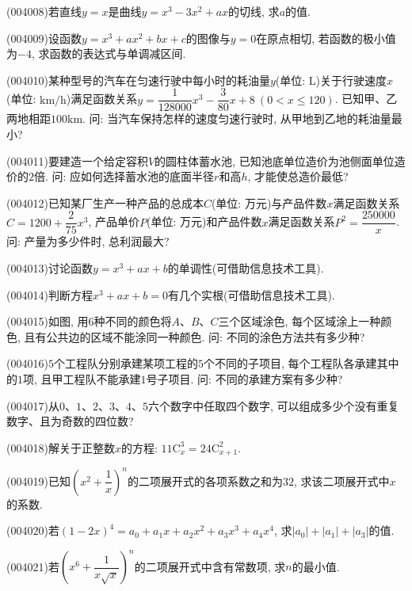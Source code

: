 \item (004008)若直线$y=x$是曲线$y=x^3-3x^2+ax$的切线, 求$a$的值.
\item (004009)设函数$y=x^3+ax^2+bx+c$的图像与$y=0$在原点相切, 若函数的极小值为$-4$, 求函数的表达式与单调减区间.
\item (004010)某种型号的汽车在匀速行驶中每小时的耗油量$y$(单位: $\text{L}$)关于行驶速度$x$(单位: $\text{km}/\text{h}$)满足函数关系$y=\dfrac 1{128000}x^3-\dfrac 3{80}x+8 \ (0<x\le 120)$. 已知甲、乙两地相距$100\text{km}$. 问: 当汽车保持怎样的速度匀速行驶时, 从甲地到乙地的耗油量最小?
\item (004011)要建造一个给定容积$V$的圆柱体蓄水池, 已知池底单位造价为池侧面单位造价的$2$倍. 问: 应如何选择蓄水池的底面半径$r$和高$h$, 才能使总造价最低?
\item (004012)已知某厂生产一种产品的总成本$C$(单位: 万元)与产品件数$x$满足函数关系$C=1200+\dfrac2 {75}x^3$, 产品单价$P$(单位: 万元)和产品件数$x$满足函数关系$P^2=\dfrac{250000}x$. 问: 产量为多少件时, 总利润最大?
\item (004013)讨论函数$y=x^3+ax+b$的单调性(可借助信息技术工具).
\item (004014)判断方程$x^3+ax+b=0$有几个实根(可借助信息技术工具).
\item (004015)如图, 用$6$种不同的颜色将$A$、$B$、$C$三个区域涂色, 每个区域涂上一种颜色, 且有公共边的区域不能涂同一种颜色. 问: 不同的涂色方法共有多少种?
\begin{center}
\end{center}
\item (004016)$5$个工程队分别承建某项工程的$5$个不同的子项目, 每个工程队各承建其中的$1$项, 且甲工程队不能承建$1$号子项目. 问: 不同的承建方案有多少种?
\item (004017)从$0$、$1$、$2$、$3$、$4$、$5$六个数字中任取四个数字, 可以组成多少个没有重复数字、且为奇数的四位数?
\item (004018)解关于正整数$x$的方程: $11\mathrm{C}_x^3=24\mathrm{C}_{x+1}^2$.
\item (004019)已知$(x^2+\dfrac 1x)^n$的二项展开式的各项系数之和为$32$, 求该二项展开式中$x$的系数.
\item (004020)若$(1-2x)^4=a_0+a_1x+a_2x^2+a_3x^3+a_4x^4$, 求$|a_0|+|a_1|+|a_3|$的值.
\item (004021)若$(x^6+\dfrac 1{x\sqrt x})^n$的二项展开式中含有常数项, 求$n$的最小值.
